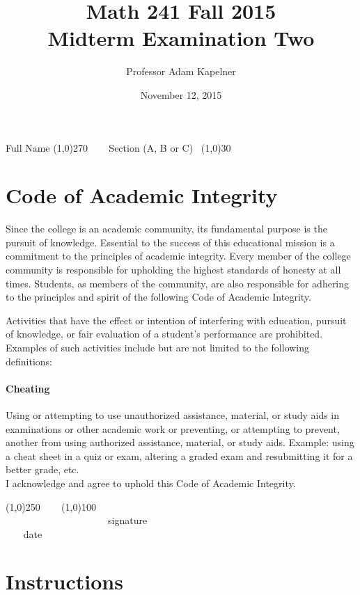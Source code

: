 \documentclass[12pt]{article}
\title{Math 241 Fall 2015 \\ Midterm Examination Two}
\author{Professor Adam Kapelner}
\date{November 12, 2015}
\begin{document}
\maketitle

\noindent Full Name \line(1,0){270} ~~~ Section (A, B or C)~ \line(1,0){30}

\thispagestyle{empty}

\section*{Code of Academic Integrity}

\footnotesize
Since the college is an academic community, its fundamental purpose is the pursuit of knowledge. Essential to the success of this educational mission is a commitment to the principles of academic integrity. Every member of the college community is responsible for upholding the highest standards of honesty at all times. Students, as members of the community, are also responsible for adhering to the principles and spirit of the following Code of Academic Integrity.

Activities that have the effect or intention of interfering with education, pursuit of knowledge, or fair evaluation of a student's performance are prohibited. Examples of such activities include but are not limited to the following definitions:

\paragraph{Cheating} Using or attempting to use unauthorized assistance, material, or study aids in examinations or other academic work or preventing, or attempting to prevent, another from using authorized assistance, material, or study aids. Example: using a cheat sheet in a quiz or exam, altering a graded exam and resubmitting it for a better grade, etc.
\\

\noindent I acknowledge and agree to uphold this Code of Academic Integrity. \\

\begin{center}
\line(1,0){250} ~~~ \line(1,0){100}\\
~~~~~~~~~~~~~~~~~~~~~signature~~~~~~~~~~~~~~~~~~~~~~~~~~~~~~~~~~~~~~~~~~~~~ date
\end{center}

\normalsize

\section*{Instructions}
\end{document}
